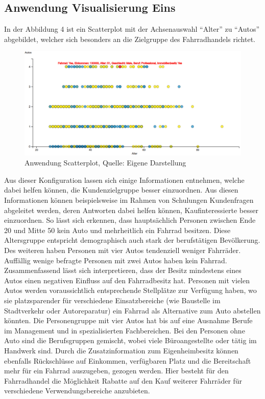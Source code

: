 \documentclass[usegeometry=true]{scrartcl}
\begin{document}
\subsection{Anwendung Visualisierung Eins}
In der Abbildung 4 ist ein Scatterplot mit der Achsenauswahl "`Alter"' zu "`Autos"' abgebildet, welcher sich besonders an die Zielgruppe des Fahrradhandels richtet.
\begin{figure}[h]
\begin{center}
\includegraphics[width=16cm]{Bilder/ScatterplotA1.png}
\caption{Anwendung Scatterplot, Quelle: Eigene Darstellung}
\end{center}
\end{figure}
\newline Aus dieser Konfiguration lassen sich einige Informationen entnehmen, welche dabei helfen können, die Kundenzielgruppe besser einzuordnen. Aus diesen Informationen können beispielsweise im Rahmen von Schulungen Kundenfragen abgeleitet werden, deren Antworten dabei helfen können, Kaufinteressierte besser einzuordnen. 
So lässt sich erkennen, dass hauptsächlich Personen zwischen Ende 20 und Mitte 50 kein Auto und mehrheitlich ein Fahrrad besitzen. Diese Altersgruppe entspricht demographisch auch stark der berufstätigen Bevölkerung. Des weiteren haben Personen mit vier Autos tendenziell weniger Fahrräder. Auffällig wenige befragte Personen mit zwei Autos haben kein Fahrrad. Zusammenfassend lässt sich interpretieren, dass der Besitz mindestens eines Autos einen negativen Einfluss auf den Fahrradbesitz hat. 
Personen mit vielen Autos werden voraussichtlich entsprechende Stellplätze zur Verfügung haben, wo sie platzsparender für verschiedene Einsatzbereiche (wie Baustelle im Stadtverkehr oder Autoreparatur) ein Fahrrad als Alternative zum Auto abstellen könnten. 
Die Personengruppe mit vier Autos hat bis auf eine Ausnahme Berufe im Management und in spezialisierten Fachbereichen. Bei den Personen ohne Auto sind die Berufsgruppen gemischt, wobei viele Büroangestellte oder tätig im Handwerk sind.
Durch die Zusatzinformation zum Eigenheimbesitz können ebenfalls Rückschlüsse auf Einkommen, verfügbaren Platz und die Bereitschaft mehr für ein Fahrrad auszugeben, gezogen werden. Hier besteht für den Fahrradhandel die Möglichkeit Rabatte auf den Kauf weiterer Fahrräder für verschiedene Verwendungsbereiche anzubieten.
\end{document}
